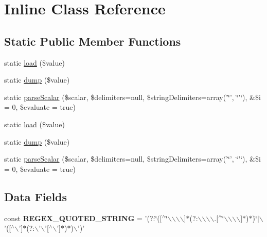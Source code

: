 \hypertarget{class_symfony_1_1_components_1_1_yaml_1_1_inline}{
\section{Inline Class Reference}
\label{class_symfony_1_1_components_1_1_yaml_1_1_inline}
}
\subsection*{Static Public Member Functions}
\begin{DoxyCompactItemize}
\item 
static \hyperlink{class_symfony_1_1_components_1_1_yaml_1_1_inline_a2b63bee7aa8c67d20c14ff9ba4de63a2}{load} (\$value)
\item 
static \hyperlink{class_symfony_1_1_components_1_1_yaml_1_1_inline_a8ef997303a6826dd4a87fff9c13b5d1d}{dump} (\$value)
\item 
static \hyperlink{class_symfony_1_1_components_1_1_yaml_1_1_inline_abf37f1e7c74d7a0ed52e64c25da8e454}{parseScalar} (\$scalar, \$delimiters=null, \$stringDelimiters=array('\char`\"{}', \char`\"{}'\char`\"{}), \&\$i = 0, \$evaluate = true) 
\item 
static \hyperlink{class_symfony_1_1_components_1_1_yaml_1_1_inline_a2b63bee7aa8c67d20c14ff9ba4de63a2}{load} (\$value)
\item 
static \hyperlink{class_symfony_1_1_components_1_1_yaml_1_1_inline_a8ef997303a6826dd4a87fff9c13b5d1d}{dump} (\$value)
\item 
static \hyperlink{class_symfony_1_1_components_1_1_yaml_1_1_inline_abf37f1e7c74d7a0ed52e64c25da8e454}{parseScalar} (\$scalar, \$delimiters=null, \$stringDelimiters=array('\char`\"{}', \char`\"{}'\char`\"{}), \&\$i = 0, \$evaluate = true) 
\end{DoxyCompactItemize}
\subsection*{Data Fields}
\begin{DoxyCompactItemize}
\item 
\hypertarget{class_symfony_1_1_components_1_1_yaml_1_1_inline_a87b5c4996630ab02b80f5abece2c2fe0}{
const {\bfseries REGEX\_\-QUOTED\_\-STRING} = '(?:\char`\"{}(\mbox{[}$^\wedge$\char`\"{}$\backslash$$\backslash$$\backslash$$\backslash$\mbox{]}$\ast$(?:$\backslash$$\backslash$$\backslash$$\backslash$.\mbox{[}$^\wedge$\char`\"{}$\backslash$$\backslash$$\backslash$$\backslash$\mbox{]}$\ast$)$\ast$)\char`\"{}$|$$\backslash$'(\mbox{[}$^\wedge$$\backslash$'\mbox{]}$\ast$(?:$\backslash$'$\backslash$'\mbox{[}$^\wedge$$\backslash$'\mbox{]}$\ast$)$\ast$)$\backslash$')'}
\label{class_symfony_1_1_components_1_1_yaml_1_1_inline_a87b5c4996630ab02b80f5abece2c2fe0}

\end{DoxyCompactItemize}
